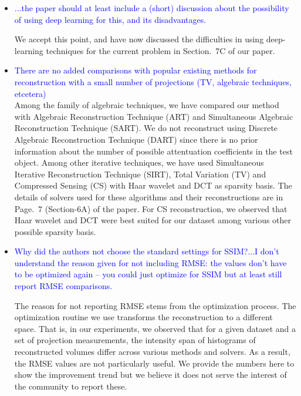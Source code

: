 \documentclass{article}
\begin{document}
 \begin{itemize}
 \item    \textcolor{blue}{...the paper should at least include a (short) discussion about the
     possibility of using deep learning for this, and its disadvantages.}

   We accept this point, and have now discussed the difficulties in
   using deep-learning techniques for the current problem in Section.~7C
   of our paper. 

\item \textcolor{blue}{There are no added comparisons with popular existing methods for
  reconstruction with a small number of projections (TV, algebraic techniques, etcetera)}\\
  
 Among the family of algebraic techniques, we have compared our method
 with Algebraic Reconstruction Technique (ART) and Simultaneous
 Algebraic Reconstruction Technique (SART). We do not reconstruct
 using Discrete Algebraic Reconstruction Technique (DART) since there
 is no prior information about the number of possible attentuation
 coefficients in the test object. Among other iterative techniques, we
 have used Simultaneous Iterative Reconstruction Technique (SIRT),
 Total Variation (TV) and Compressed Sensing (CS) with Haar wavelet
 and DCT as sparsity basis. The details of solvers used for these
 algorithms and their reconstructions are in Page.~7 (Section-6A) of
 the paper. For CS reconstruction, we observed that Haar wavelet and
 DCT were best suited for our dataset among various other possible
 sparsity basis.

\item \textcolor{blue}{Why did the authors not choose the standard
  settings for SSIM?...I don’t understand the reason given for not
  including RMSE: the values don’t have to be optimized again -- you
  could just optimize for SSIM but at least still report RMSE
  comparisons.}

  The reason for not reporting RMSE stems from the optimization
  process. The optimization routine we use transforms the
  reconstruction to a different space.  That is, in our experiments,
  we observed that for a given dataset and a set of projection
  measurements, the intensity span of histograms of reconstructed
  volumes differ across various methods and solvers. As a result, the
  RMSE values are not particularly useful.  We provide the numbers
  here to show the improvement trend but we believe it does not serve
  the interest of the community to report these.


\end{itemize}
\end{document}
